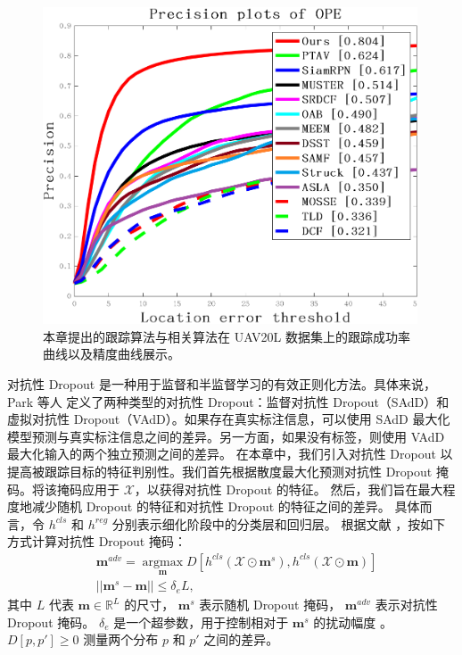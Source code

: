 \begin{figure}[t]
\begin{minipage}{0.48\textwidth}
  \centerline{\includegraphics[width=0.99\textwidth]{Img/end/quality_plot_error_OPE_threshold.png}}
\end{minipage}
\caption{本章提出的跟踪算法与相关算法在 UAV20L \cite{mueller2016benchmark} 数据集上的跟踪成功率曲线以及精度曲线展示。}
\label{fig:end_uav20l}
\end{figure}
对抗性 Dropout 是一种用于监督和半监督学习的有效正则化方法。具体来说，Park 等人 \cite{park2018adversarial} 定义了两种类型的对抗性 Dropout：监督对抗性 Dropout（SAdD）和虚拟对抗性 Dropout（VAdD）。如果存在真实标注信息，可以使用 SAdD 最大化模型预测与真实标注信息之间的差异。另一方面，如果没有标签，则使用 VAdD 最大化输入的两个独立预测之间的差异。%
在本章中，我们引入对抗性 Dropout 以提高被跟踪目标的特征判别性。我们首先根据散度最大化预测对抗性 Dropout 掩码。将该掩码应用于 $\mathcal{X}$，以获得对抗性 Dropout 的特征。
然后，我们旨在最大程度地减少随机 Dropout 的特征和对抗性 Dropout 的特征之间的差异。
具体而言，令 $h^{cls}$ 和 $h^{reg}$ 分别表示细化阶段中的分类层和回归层。
根据文献 \cite{lee2019drop}，按如下方式计算对抗性 Dropout 掩码：
\begin{equation}
\begin{split}
    & \mathbf{m}^{adv} = \mathop{\arg\max}\limits_{\mathbf{m}}D[h^{cls}(\mathcal{X} \odot \mathbf{m}^s), h^{cls}(\mathcal{X} \odot \mathbf{m})] \\
    & ||\mathbf{m}^s - \mathbf{m}|| \leq \delta_e L,
\end{split}
\end{equation}
其中 $L$ 代表 $\mathbf{m} \in \mathbb R^L$ 的尺寸，
$\mathbf{m}^s$ 表示随机 Dropout 掩码， $\mathbf{m}^{adv}$ 表示对抗性 Dropout 掩码。
$\delta_{e}$ 是一个超参数，用于控制相对于 $\mathbf{m}^{s}$ 的扰动幅度 \cite{lee2019drop}。
$D[p, p'] \geq 0$ 测量两个分布 $p$ 和 $p'$ 之间的差异。


